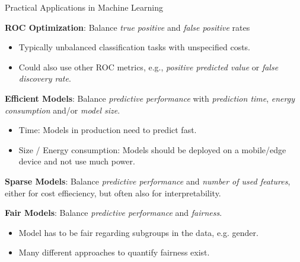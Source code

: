 \begin{frame}[allowframebreaks]{Practical Applications in Machine Learning}

    \textbf{ROC Optimization}: Balance \emph{true positive} and \emph{false positive} rates
  \begin{itemize}
    \item Typically unbalanced classification tasks with unspecified costs.
    \item Could also use other ROC metrics, e.g., \emph{positive predicted value} or \emph{false discovery rate}.
  \end{itemize}

\textbf{Efficient Models}:
    Balance \emph{predictive performance} with \emph{prediction time}, \emph{energy consumption} and/or \emph{model size}.
  \begin{itemize}
    \item Time: Models in production need to predict fast.
    \item Size / Energy consumption: Models should be deployed on a mobile/edge device and not use much power.
  \end{itemize}
    
\textbf{Sparse Models}: Balance \emph{predictive performance} and \emph{number of used features}, either for cost effieciency, but often also for interpretability.

\textbf{Fair Models}:
  Balance \emph{predictive performance} and \emph{fairness}.
  \begin{itemize}
    \item Model has to be fair regarding subgroups in the data, e.g. gender.
    \item Many different approaches to quantify fairness exist.
  \end{itemize}


\end{frame}

